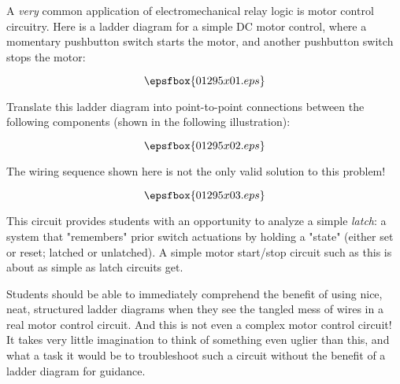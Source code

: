 

A {\it very} common application of electromechanical relay logic is motor control circuitry.  Here is a ladder diagram for a simple DC motor control, where a momentary pushbutton switch starts the motor, and another pushbutton switch stops the motor:

$$\epsfbox{01295x01.eps}$$

Translate this ladder diagram into point-to-point connections between the following components (shown in the following illustration):

$$\epsfbox{01295x02.eps}$$







The wiring sequence shown here is not the only valid solution to this problem!

$$\epsfbox{01295x03.eps}$$







This circuit provides students with an opportunity to analyze a simple {\it latch}: a system that "remembers" prior switch actuations by holding a "state" (either set or reset; latched or unlatched).  A simple motor start/stop circuit such as this is about as simple as latch circuits get.

Students should be able to immediately comprehend the benefit of using nice, neat, structured ladder diagrams when they see the tangled mess of wires in a real motor control circuit.  And this is not even a complex motor control circuit!  It takes very little imagination to think of something even uglier than this, and what a task it would be to troubleshoot such a circuit without the benefit of a ladder diagram for guidance.




